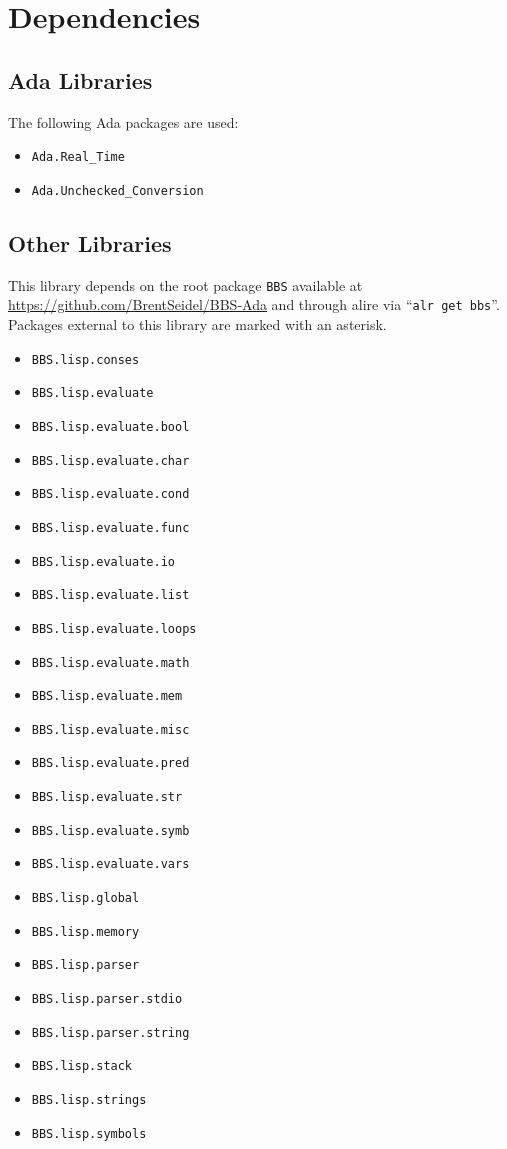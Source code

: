 \documentclass[10pt, openany]{book}
\newcommand{\package}[1]{\texttt{#1}}
\newcommand{\keyword}[1]{\texttt{#1}}
\begin{document}
\section{Dependencies}
\subsection{Ada Libraries}
The following Ada packages are used:
\begin{itemize}
  \item \package{Ada.Real\_Time}
  \item \package{Ada.Unchecked\_Conversion}
\end{itemize}

\subsection{Other Libraries}
This library depends on the root package \package{BBS} available at \url{https://github.com/BrentSeidel/BBS-Ada} and through alire via ``\keyword{alr get bbs}''.  Packages external to this library are marked with an asterisk.
\begin{itemize}
  \item \package{BBS.lisp.conses}
  \item \package{BBS.lisp.evaluate}
  \item \package{BBS.lisp.evaluate.bool}
  \item \package{BBS.lisp.evaluate.char}
  \item \package{BBS.lisp.evaluate.cond}
  \item \package{BBS.lisp.evaluate.func}
  \item \package{BBS.lisp.evaluate.io}
  \item \package{BBS.lisp.evaluate.list}
  \item \package{BBS.lisp.evaluate.loops}
  \item \package{BBS.lisp.evaluate.math}
  \item \package{BBS.lisp.evaluate.mem}
  \item \package{BBS.lisp.evaluate.misc}
  \item \package{BBS.lisp.evaluate.pred}
  \item \package{BBS.lisp.evaluate.str}
  \item \package{BBS.lisp.evaluate.symb}
  \item \package{BBS.lisp.evaluate.vars}
  \item \package{BBS.lisp.global}
  \item \package{BBS.lisp.memory}
  \item \package{BBS.lisp.parser}
  \item \package{BBS.lisp.parser.stdio}
  \item \package{BBS.lisp.parser.string}
  \item \package{BBS.lisp.stack}
  \item \package{BBS.lisp.strings}
  \item \package{BBS.lisp.symbols}
\end{itemize}
\end{document}
